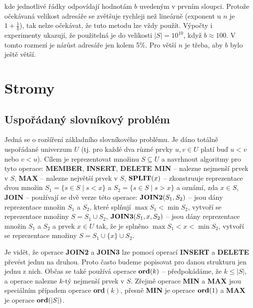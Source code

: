 \documentclass[a4paper,12pt]{article}
\begin{document}
kde jednotlivé řádky odpovídají hodnotám $
b$ 
uvedeným v prv\-ním sloupci. Protože očekávaná velikost 
adresáře se zvětšu\-je rychleji než lineárně (exponent u $
n$ je $1+\frac 1b$), 
tak nelze očekávat, že tuto metodu lze vždy použít. 
Výpočty i expe\-ri\-menty uka\-zu\-jí, že použitelná je do 
velikosti $|S|=10^{10}$, když $b\approx 100$. V tomto rozmezí je 
nárůst adresáře jen kolem 5\%. Pro větší $
n$ je 
třeba, aby $b$ bylo ještě větší.


\section{Stromy}

\subsection{Uspořádaný slovníkový problém}

Jedná se o rozšíření základního slovníkového problému. Je 
dáno totálně uspořádané univerzum $U$ (tj. pro každé dva 
různé prvky $u,v\in U$ platí buď $u<v$ nebo $v<
u$). Cílem 
je reprezentovat 
množinu $S\subseteq U$ a navrhnout algoritmy pro tyto operace:\newline 
{\bf MEMBER}, {\bf INSERT}, {\bf DELETE\newline 
MIN} -- nalezne nejmenší prvek v $S$,\newline 
{\bf MAX} -- nalezne největší prvek v $S$,\newline 
$\bold S\bold P\bold L\bold I\bold T(x)$ -- zkonstruuje reprezentace dvou množin 
$S_1=\{s\in S\mid s<x\}$ a $S_2=\{s\in S\mid s>x\}$ a oznámí, zda 
$x\in S$,\newline 
{\bf JOIN} -- používají se dvě verze této operace:\newline 
$\bold J\bold O\bold I\bold N\bold 2(S_1,S_2)$ -- jsou dány reprezentace množin $
S_1$ a $S_2$, které 
splňují $\max S_1<\min S_2$, vytvoří se reprezentace množiny 
$S=S_1\cup S_2$,\newline 
$\bold J\bold O\bold I\bold N\bold 3(S_1,x,S_2)$ -- jsou dány reprezentace množin $
S_1$ a $S_2$ a 
prvek $x\in U$ tak, že je splněno $\max S_1<x<\min S_2$, vytvoří 
se reprezentace množiny $S=S_1\cup \{x\}\cup S_2$.

Je vidět, že operace {\bf JOIN2} a {\bf JOIN3} lze pomocí ope\-rací 
{\bf INSERT} a {\bf DELETE} převést jednu na druhou. Proto často budeme 
popisovat pro danou strukturu jen jednu z nich. 
Občas se také používá operace\newline 
$\bold o\bold r\bold d(k)$ -- předpokádáme, že $k\le |S
|$, a operace nalezne $k$-tý 
nejmenší prvek v $S$.\newline 
Zřejmě operace {\bf MIN} a {\bf MAX} jsou speciálním případem 
ope\-race {\bf ord$(k)$}, 
přesně {\bf MIN} je operace $\bold o\bold r\bold d(1)$ a {\bf MAX} je operace $
\bold o\bold r\bold d(|S|)$.
\end{document}
